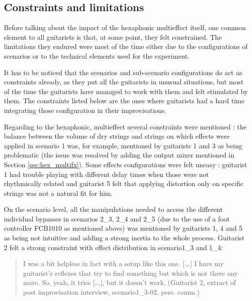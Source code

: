 \documentclass{article}
\begin{document}

\subsection{Constraints and limitations}
Before talking about the impact of the hexaphonic multieffect itself, one common element to all guitarists is that, at some point, they felt constrained. The limitations they endured were most of the time either due to the configurations of scenarios or to the technical elements used for the experiment.

It has to be noticed that the scenarios and sub-scenario configurations do act as constraints already, as they put all the guitarists in unusual situations, but most of the time the guitarists have managed to work with them and felt stimulated by them. The constraints listed below are the ones where guitarists had a hard time integrating those configuration in their improvisations.

Regarding to the hexaphonic, multieffect several constraints were mentioned : the balance between the volume of dry strings and strings on which effects were applied in scenario 1 was, for example, mentioned by guitarists 1 and 3 as being problematic (the issue was resolved by adding the output mixer mentioned in Section \ref{sec:hex_multifx}). Some effects configurations were felt uneasy : guitarist 1 had trouble playing with different delay times when those were not rhythmically related and guitarist 5 felt that applying distortion only on specific strings was not a natural fit for him. 

On the scenario level, all the manipulations needed to access the different individual bypasses in scenarios 2\_3, 2\_4 and 2\_5 (due to the use of a foot controller FCB1010 as mentioned above) was mentioned by guitarists 1, 4 and 5 as being not intuitive and adding a strong inertia to the whole process.
Guitarist 2 felt a strong constraint with effect distribution in scenario1\_3 and 1\_4:
    \begin{quote}
        I was a bit helpless in fact with a setup like this one. [...] I have my guitarist's reflexes that try to find something but which is not there any more. So, yeah, it tries [...], but it doesn't work. (Guitarist 2, extract of post improvisation interview, scenario1\_3-02, pers. comm.)
    \end{quote}
\end{document}
